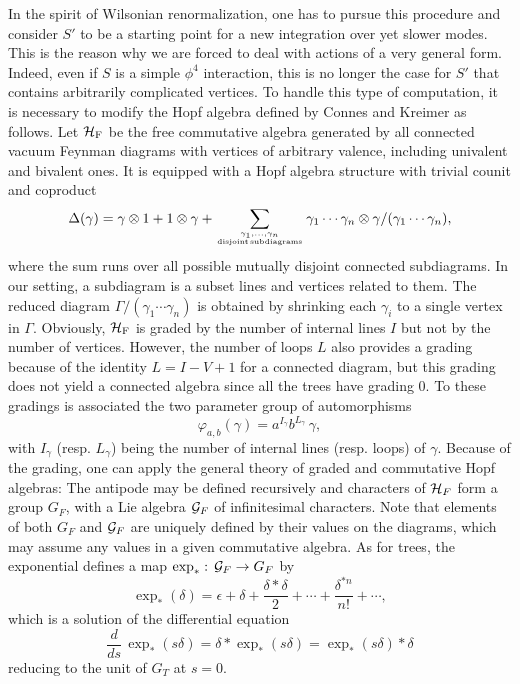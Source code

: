 \documentclass[12pt,here,feynmf]{article}
\begin{document}
In the spirit of Wilsonian renormalization, one has to pursue this procedure and consider $S'$ to be a starting point for a new integration over yet slower modes. This is the reason why we are forced to deal with actions of a very general form. Indeed, even if $S$ is a simple $\phi^{4}$ interaction, this is no longer the case for $S'$ that contains arbitrarily complicated vertices. To handle this type of computation, it is necessary to modify the Hopf algebra defined by Connes and Kreimer as follows. Let ${\cal H}_{\mathrm{F}}$ be the free commutative algebra generated by all connected vacuum Feynman diagrams with vertices of arbitrary valence, including univalent and bivalent ones.  It is equipped with a Hopf algebra structure with trivial counit and coproduct
\begin{equation}
\Delta(\gamma)=\gamma\otimes 1+1\otimes\gamma+
\mathop{\sum}\limits_{\gamma_{1},\dots,\gamma_{n}\atop
\mathrm{disjoint\,subdiagrams}}
\gamma_{1}\cdots\gamma_{n}\otimes\gamma/(\gamma_{1}\cdots\gamma_{n}),
\label{coproductfeyn}
\end{equation}
where the sum runs over all possible mutually disjoint connected subdiagrams. In our setting, a subdiagram is a subset lines and vertices related to them. The reduced diagram $\Gamma/(\gamma_{1}\cdots\gamma_{n})$ is obtained by shrinking each $\gamma_{i}$ to a single vertex in $\Gamma$. Obviously, ${\cal H}_{\mathrm{F}}$ is graded by the number of internal lines $I$ but not by the number of vertices. However, the number of loops $L$ also provides a grading because of the identity $L=I-V+1$ for a connected diagram, but this grading does not yield a connected algebra since all the trees have grading 0. To these gradings is associated the two parameter group of automorphisms
\begin{equation}
\varphi_{a,b}(\gamma)=a^{I_{\gamma}}b^{L_{\gamma}}\,\gamma,\label{auto}
\end{equation}
with $I_{\gamma}$ (resp. $L_{\gamma}$) being the number of internal lines (resp. loops) of $\gamma$. Because of the grading, one can apply the general theory of graded and commutative Hopf algebras: The antipode may be defined recursively and characters of ${\cal H}_{F}$  form a group $G_{F}$, with a Lie algebra ${\cal G}_{F}$ of infinitesimal characters. Note that elements of both $G_{F}$ and ${\cal G}_{F}$ are uniquely defined by their values on the diagrams, which may assume any values in a given commutative algebra. As for trees, the exponential defines a map $\exp_{\ast}:\,{\cal G}_{F}\rightarrow G_{F}$ by
\begin{equation}
\exp_{\ast}(\delta)=\epsilon+\delta+\frac{\delta\ast\delta}{2}+\cdots+
\frac{\delta^{\ast n}}{n!}+\cdots,
\end{equation}
which is a solution of the differential equation
\begin{equation}
\frac{d}{ds}\,\exp_{\ast}(s\delta)=\delta\ast \exp_{\ast}(s\delta)=\exp_{\ast}(s\delta)\ast\delta
\label{diffFeyn}
\end{equation}
reducing to the unit of $G_{T}$ at $s=0$.
\end{document}
